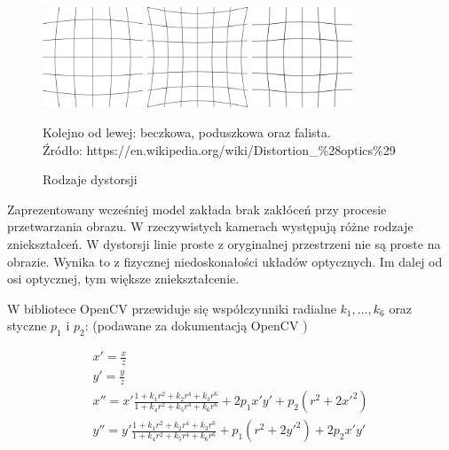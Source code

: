 \documentclass[oneside, eng]{mgr}
\begin{document}
\begin{figure}
\centering
		\begin{minipage}{3cm}
			\includegraphics[width=3cm]{600px-Barrel_distortion.png}
		\end{minipage}
		\begin{minipage}{3cm}
			\includegraphics[width=3cm]{600px-Pincushion_distortion.png}
		\end{minipage}
		\begin{minipage}{3cm}
			\includegraphics[width=3cm]{600px-Mustache_distortion.png}
		\end{minipage}
	\caption{Rodzaje dystorsji}
Kolejno od lewej: beczkowa, poduszkowa oraz falista. \\
Źródło: https://en.wikipedia.org/wiki/Distortion\_\%28optics\%29
	\label{fig:distortion}
\end{figure}

Zaprezentowany wcześniej model zakłada brak zakłóceń przy procesie przetwarzania obrazu. W rzeczywistych kamerach występują różne rodzaje zniekształceń. W dystorsji linie proste z oryginalnej przestrzeni nie są proste na obrazie. Wynika to z fizycznej niedoskonałości układów optycznych. Im dalej od osi optycznej, tym większe zniekształcenie.

W bibliotece OpenCV przewiduje się współczynniki radialne $k_1, ..., k_6$ oraz styczne $p_1$ i $p_2$:
(podawane za dokumentacją OpenCV \cite{Dokumentacja OpenCV})

\begin{gather*}
	x' = \frac{x}{z} \\
	y' = \frac{y}{z} \\
	x'' = x' \frac{1+k_1 r^2 + k_2 r^4 + k_3 r^6}{1+k_4 r^2+k_5 r^4+k_6 r^6} +
	2 p_1 x' y' + p_2(r^2 + 2 x'^2)	\\
	y'' = y' \frac{1+k_1 r^2 + k_2 r^4 + k_3 r^6}{1+k_4 r^2+k_5 r^4+k_6 r^6} +
	p_1(r^2 + 2 y'^2) + 2 p_2 x' y'
\end{gather*}
\end{document}

